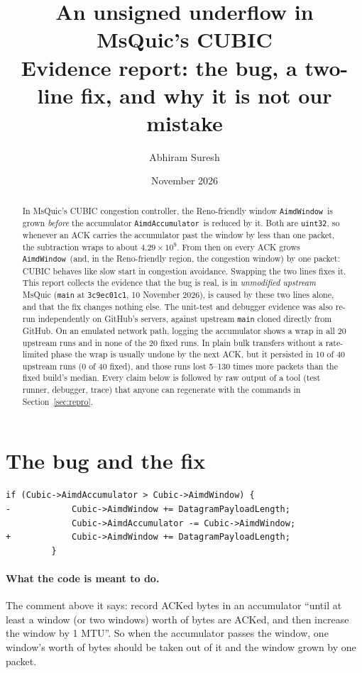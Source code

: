 \documentclass[11pt,a4paper]{article}
\title{\textbf{An unsigned underflow in MsQuic's CUBIC}\\[3pt]
  \large Evidence report: the bug, a two-line fix, and why it is not our mistake}
\author{Abhiram Suresh}
\date{November 2026}
\newcommand{\acc}{\texttt{AimdAccumulator}}
\newcommand{\aw}{\texttt{AimdWindow}}
\begin{document}
\maketitle

\begin{abstract}
\noindent
In MsQuic's CUBIC congestion controller, the Reno-friendly window \aw\ is grown
\emph{before} the accumulator \acc\ is reduced by it. Both are \texttt{uint32},
so whenever an ACK carries the accumulator past the window by less than one
packet, the subtraction wraps to about $4.29\times10^9$. From then on every ACK
grows \aw\ (and, in the Reno-friendly region, the congestion window) by one
packet: CUBIC behaves like slow start in congestion avoidance. Swapping the two
lines fixes it. This report collects the evidence that the bug is real, is in
\emph{unmodified upstream} MsQuic (\texttt{main} at \texttt{3c9ec01c1},
10 November 2026), is caused by these two lines alone, and that the fix
changes nothing else. The unit-test and debugger evidence was also re-run
independently on GitHub's servers, against upstream \texttt{main} cloned
directly from GitHub. On an emulated network path, logging the accumulator
shows a wrap in all 20 upstream runs and in none of the 20 fixed runs. In plain
bulk transfers without a rate-limited phase the wrap is usually undone by the
next ACK, but it persisted in 10 of 40 upstream runs (0 of 40 fixed), and those
runs lost 5--130 times more packets than the fixed build's median. Every claim below is followed by raw output of a tool
(test runner, debugger, trace) that anyone can regenerate with the commands in
Section~\ref{sec:repro}.
\end{abstract}

\section{The bug and the fix}

\begin{lstlisting}[style=diff,title={\footnotesize\texttt{src/core/cubic.c}, \texttt{CubicCongestionControlOnDataAcknowledged} (upstream \texttt{main}, lines 659--662)}]
         if (Cubic->AimdAccumulator > Cubic->AimdWindow) {
-            Cubic->AimdWindow += DatagramPayloadLength;
             Cubic->AimdAccumulator -= Cubic->AimdWindow;
+            Cubic->AimdWindow += DatagramPayloadLength;
         }
\end{lstlisting}

\paragraph{What the code is meant to do.} The comment above it says: record
ACKed bytes in an accumulator ``until at least a window (or two windows) worth
of bytes are ACKed, and then increase the window by 1 MTU''. So when the
accumulator passes the window, one window's worth of bytes should be taken out
of it and the window grown by one packet.
\end{document}
